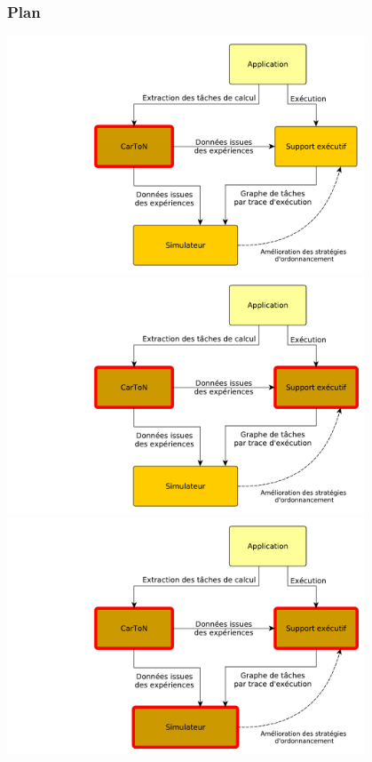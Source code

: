 \documentclass[xcolor={usenames,dvipsnames,svgnames,table}, aspectratio=43]{beamer}
\begin{document}
\begin{frame}
  \frametitle{Plan}
   {%
    \includegraphics[width=0.8\textwidth]{graph/big_picture-part1.pdf}%
  }%
   {%
    \includegraphics[width=0.8\textwidth]{graph/big_picture-part1-2.pdf}%
  }%
   {%
    \includegraphics[width=0.8\textwidth]{graph/big_picture-part1-3.pdf}%
  }%
\end{frame}
\end{document}
